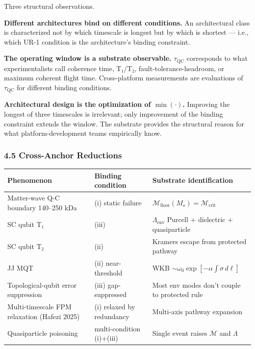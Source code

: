 \documentclass[
  11pt,
  a4paper,
]{article}
\newcounter{none} %
\begin{document}
Three structural observations.

\textbf{Different architectures bind on different conditions.} An
architectural class is characterized not by which timescale is longest
but by which is shortest --- i.e., which UR-1 condition is the
architecture's binding constraint.

\textbf{The operating window is a substrate observable.}
\(\tau_{\mathrm{QC}}\) corresponds to what experimentalists call
coherence time, T₁/T₂, fault-tolerance-headroom, or maximum coherent
flight time. Cross-platform measurements are evaluations of
\(\tau_{\mathrm{QC}}\) for different binding conditions.

\textbf{Architectural design is the optimization of \(\min(\cdot)\).}
Improving the longest of three timescales is irrelevant; only
improvement of the binding constraint extends the window. The substrate
provides the structural reason for what platform-development teams
empirically know.

\subsubsection{4.5 Cross-Anchor
Reductions}\label{cross-anchor-reductions}

{\def\LTcaptype{none} %
\begin{longtable}[]{@{}
  >{\raggedright\arraybackslash}p{}
  >{\raggedright\arraybackslash}p{}
  >{\raggedright\arraybackslash}p{}@{}}
\toprule\noalign{}
\begin{minipage}[b]{\linewidth}\raggedright
Phenomenon
\end{minipage} & \begin{minipage}[b]{\linewidth}\raggedright
Binding condition
\end{minipage} & \begin{minipage}[b]{\linewidth}\raggedright
Substrate identification
\end{minipage} \\
\midrule\noalign{}
\endhead
\bottomrule\noalign{}
\endlastfoot
Matter-wave Q-C boundary 140--250 kDa & (i) static failure &
\(\mathcal{M}_{\mathrm{floor}}(M_\star) = \mathcal{M}_{\mathrm{crit}}\) \\
SC qubit T₁ & (iii) & \(\Lambda_{\mathrm{env}}\) Purcell + dielectric +
quasiparticle \\
SC qubit T₂ & (ii) & Kramers escape from protected pathway \\
JJ MQT & (ii) near-threshold & WKB
\(\sim \omega_0\exp[-\alpha\int\sigma\,d\ell]\) \\
Topological-qubit error suppression & (iii) gap-suppressed & Most env
modes don't couple to protected rule \\
Multi-timescale FPM relaxation (Hafezi 2025) & (i) relaxed by redundancy
& Multi-axis pathway expansion \\
Quasiparticle poisoning & multi-condition (i)+(iii) & Single event
raises \(\mathcal{M}\) and \(\Lambda\) \\
\end{longtable}
}
\end{document}
